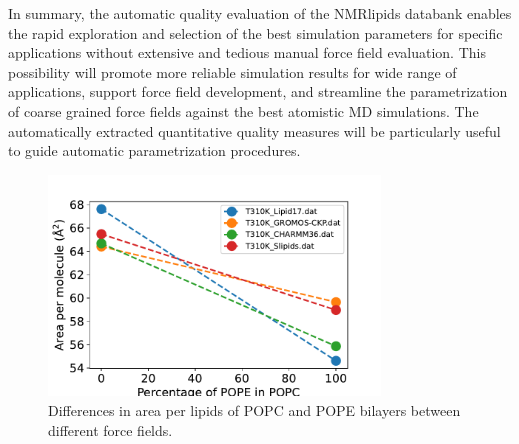 \documentclass[fleqn,10pt]{wlscirep}
\begin{document}
In summary, the automatic quality evaluation of the NMRlipids databank enables the rapid exploration and selection of the best simulation parameters for specific applications without extensive and tedious manual force field evaluation. This possibility will promote more reliable simulation results for wide range of applications, support force field development, and streamline the parametrization of coarse grained force fields against the best atomistic MD simulations. The automatically extracted quantitative quality measures will be particularly useful to guide automatic parametrization procedures.



\begin{figure}[tbp]
    \centering
    \includegraphics[width=88mm]{Figures/APL.pdf}
    \caption{Differences in area per lipids of POPC and POPE bilayers between different force fields.  
    }
    \label{fig:POPCPOPEapls}
\end{figure}
\end{document}
